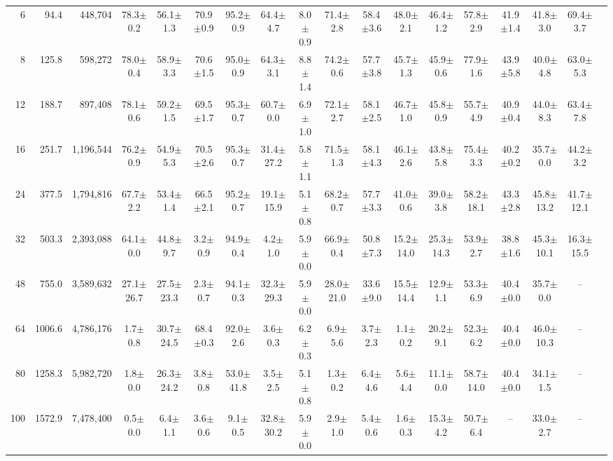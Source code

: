 \begin{table}[p]
{\begin{tabular}{rrrccccccccccccccc}
\rowcolor{natgood}
6 & 94.4 & 448,704 & 78.3$\pm$0.2 & 56.1$\pm$1.3 & 70.9$\pm$0.9 & 95.2$\pm$0.9 & 64.4$\pm$4.7 & 8.0$\pm$0.9 & 71.4$\pm$2.8 & 58.4$\pm$3.6 & 48.0$\pm$2.1 & 46.4$\pm$1.2 & 57.8$\pm$2.9 & 41.9$\pm$1.4 & 41.8$\pm$3.0 & 69.4$\pm$3.7 \\
\rowcolor{natgood}
8 & 125.8 & 598,272 & 78.0$\pm$0.4 & 58.9$\pm$3.3 & 70.6$\pm$1.5 & 95.0$\pm$0.9 & 64.3$\pm$3.1 & 8.8$\pm$1.4 & 74.2$\pm$0.6 & 57.7$\pm$3.8 & 45.7$\pm$1.3 & 45.9$\pm$0.6 & 77.9$\pm$1.6 & 43.9$\pm$5.8 & 40.0$\pm$4.8 & 63.0$\pm$5.3 \\
12 & 188.7 & 897,408 & 78.1$\pm$0.6 & 59.2$\pm$1.5 & 69.5$\pm$1.7 & 95.3$\pm$0.7 & 60.7$\pm$0.0 & 6.9$\pm$1.0 & 72.1$\pm$2.7 & 58.1$\pm$2.5 & 46.7$\pm$1.0 & 45.8$\pm$0.9 & 55.7$\pm$4.9 & 40.9$\pm$0.4 & 44.0$\pm$8.3 & 63.4$\pm$7.8 \\
16 & 251.7 & 1,196,544 & 76.2$\pm$0.9 & 54.9$\pm$5.3 & 70.5$\pm$2.6 & 95.3$\pm$0.7 & 31.4$\pm$27.2 & 5.8$\pm$1.1 & 71.5$\pm$1.3 & 58.1$\pm$4.3 & 46.1$\pm$2.6 & 43.8$\pm$5.8 & 75.4$\pm$3.3 & 40.2$\pm$0.2 & 35.7$\pm$0.0 & 44.2$\pm$3.2 \\
24 & 377.5 & 1,794,816 & 67.7$\pm$2.2 & 53.4$\pm$1.4 & 66.5$\pm$2.1 & 95.2$\pm$0.7 & 19.1$\pm$15.9 & 5.1$\pm$0.8 & 68.2$\pm$0.7 & 57.7$\pm$3.3 & 41.0$\pm$0.6 & 39.0$\pm$3.8 & 58.2$\pm$18.1 & 43.3$\pm$2.8 & 45.8$\pm$13.2 & 41.7$\pm$12.1 \\
32 & 503.3 & 2,393,088 & 64.1$\pm$0.0 & 44.8$\pm$9.7 & 3.2$\pm$0.9 & 94.9$\pm$0.4 & 4.2$\pm$1.0 & 5.9$\pm$0.0 & 66.9$\pm$0.4 & 50.8$\pm$7.3 & 15.2$\pm$14.0 & 25.3$\pm$14.3 & 53.9$\pm$2.7 & 38.8$\pm$1.6 & 45.3$\pm$10.1 & 16.3$\pm$15.5 \\
48 & 755.0 & 3,589,632 & 27.1$\pm$26.7 & 27.5$\pm$23.3 & 2.3$\pm$0.7 & 94.1$\pm$0.3 & 32.3$\pm$29.3 & 5.9$\pm$0.0 & 28.0$\pm$21.0 & 33.6$\pm$9.0 & 15.5$\pm$14.4 & 12.9$\pm$1.1 & 53.3$\pm$6.9 & 40.4$\pm$0.0 & 35.7$\pm$0.0 & -- \\
\rowcolor{natbad}
64 & 1006.6 & 4,786,176 & 1.7$\pm$0.8 & 30.7$\pm$24.5 & 68.4$\pm$0.3 & 92.0$\pm$2.6 & 3.6$\pm$0.3 & 6.2$\pm$0.3 & 6.9$\pm$5.6 & 3.7$\pm$2.3 & 1.1$\pm$0.2 & 20.2$\pm$9.1 & 52.3$\pm$6.2 & 40.4$\pm$0.0 & 46.0$\pm$10.3 & -- \\
\rowcolor{natbad}
80 & 1258.3 & 5,982,720 & 1.8$\pm$0.0 & 26.3$\pm$24.2 & 3.8$\pm$0.8 & 53.0$\pm$41.8 & 3.5$\pm$2.5 & 5.1$\pm$0.8 & 1.3$\pm$0.2 & 6.4$\pm$4.6 & 5.6$\pm$4.4 & 11.1$\pm$0.0 & 58.7$\pm$14.0 & 40.4$\pm$0.0 & 34.1$\pm$1.5 & -- \\
\rowcolor{natbad}
100 & 1572.9 & 7,478,400 & 0.5$\pm$0.0 & 6.4$\pm$1.1 & 3.6$\pm$0.6 & 9.1$\pm$0.5 & 32.8$\pm$30.2 & 5.9$\pm$0.0 & 2.9$\pm$1.0 & 5.4$\pm$0.6 & 1.6$\pm$0.3 & 15.3$\pm$4.2 & 50.7$\pm$6.4 & -- & 33.0$\pm$2.7 & -- \\

\end{tabular}}
\end{table}
